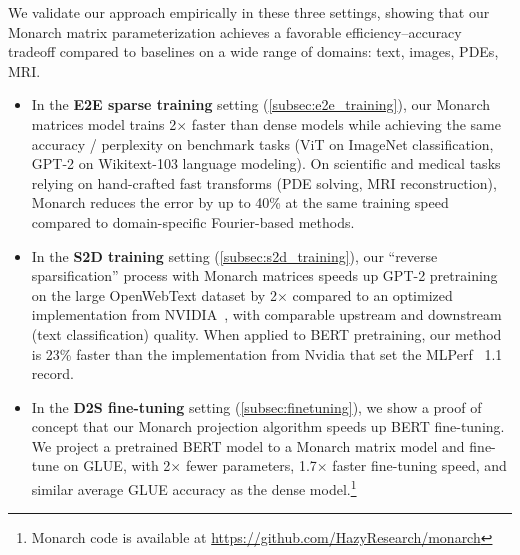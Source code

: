 We validate our approach empirically in these three settings, showing that our Monarch matrix parameterization achieves a favorable efficiency--accuracy tradeoff compared to baselines on a wide range of domains: text, images, PDEs, MRI.
\iftoggle{arxiv}{}{
\vspace{-0.25em}
}
\begin{itemize}[leftmargin=*,nosep,nolistsep,noitemsep]
\item In the \textbf{E2E sparse training} setting (\cref{subsec:e2e_training}), our Monarch matrices model trains 2$\times$ faster than dense models while achieving the same accuracy / perplexity on benchmark tasks (ViT on ImageNet classification, GPT-2 on Wikitext-103 language modeling).
On scientific and medical tasks relying on hand-crafted fast transforms (PDE solving, MRI reconstruction), Monarch reduces the error by up to 40\% at the same training speed compared to domain-specific Fourier-based methods.
\item In the \textbf{S2D training} setting (\cref{subsec:s2d_training}), our ``reverse sparsification'' process with Monarch matrices speeds up GPT-2 pretraining on the large OpenWebText dataset by 2$\times$ compared to an optimized implementation from NVIDIA~\citep{shoeybi2019megatron}, with comparable upstream and downstream (text classification) quality.
When applied to BERT pretraining, our method is 23\% faster than the implementation from Nvidia that set the MLPerf~\citep{mattson2020mlperf} 1.1 record.
\item In the \textbf{D2S fine-tuning} setting (\cref{subsec:finetuning}), we show a proof of concept that our Monarch projection algorithm speeds up BERT fine-tuning.
We project a pretrained BERT model to a Monarch matrix model and fine-tune on GLUE, with 2$\times$ fewer parameters, 1.7$\times$ faster fine-tuning speed, and similar average GLUE accuracy as the dense model.\footnote{Monarch code is available at \url{https://github.com/HazyResearch/monarch}}
\end{itemize}

